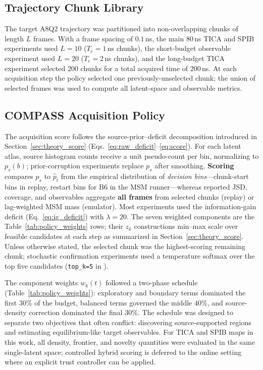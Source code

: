 \documentclass[journal=jctcce,manuscript=article,layout=twocolumn]{achemso}
\begin{document}
\subsection{Trajectory Chunk Library}

The target A8Q2 trajectory was partitioned into non-overlapping chunks of length $L$ frames. With a frame spacing of $0.1$\,ns, the main $80$\,ns TICA and SPIB experiments used $L=10$ ($T_c=1$\,ns chunks), the short-budget observable experiment used $L=20$ ($T_c=2$\,ns chunks), and the long-budget TICA experiment selected 200 chunks for a total acquired time of $200$\,ns. At each acquisition step the policy selected one previously-unselected chunk; the union of selected frames was used to compute all latent-space and observable metrics.

\subsection{COMPASS Acquisition Policy}
\label{sec:methods_compass}

The acquisition score follows the source-prior--deficit decomposition introduced in Section~\ref{sec:theory_score} (Eqs.~\ref{eq:raw_deficit}--\ref{eq:score}). For each latent atlas, source histogram counts receive a unit pseudo-count per bin, normalizing to $p_s(b)$; prior-corruption experiments replace $p_s$ after smoothing. \textbf{Scoring} compares $p_s$ to $\hat{p}_t$ from the empirical distribution of \emph{decision bins}---chunk-start bins in replay, restart bins for B6 in the MSM runner---whereas reported JSD, coverage, and observables aggregate \textbf{all frames} from selected chunks (replay) or lag-weighted MSM mass (emulator). Most experiments used the information-gain deficit (Eq.~\ref{eq:ig_deficit}) with $\lambda=20$. The seven weighted components are the Table~\ref{tab:policy_weights} rows; their $z_k$ constructions min--max scale over feasible candidates at each step as summarized in Section~\ref{sec:theory_score}. Unless otherwise stated, the selected chunk was the highest-scoring remaining chunk; stochastic confirmation experiments used a temperature softmax over the top five candidates (\texttt{top\_k=5} in ).

The component weights $w_k(t)$ followed a two-phase schedule (Table~\ref{tab:policy_weights}): exploratory and boundary terms dominated the first $30\%$ of the budget, balanced terms governed the middle $40\%$, and source-density correction dominated the final $30\%$. The schedule was designed to separate two objectives that often conflict: discovering source-supported regions and estimating equilibrium-like target observables. For TICA and SPIB maps in this work, all density, frontier, and novelty quantities were evaluated in the same single-latent space; controlled hybrid scoring is deferred to the online setting where an explicit trust controller can be applied.
\end{document}

